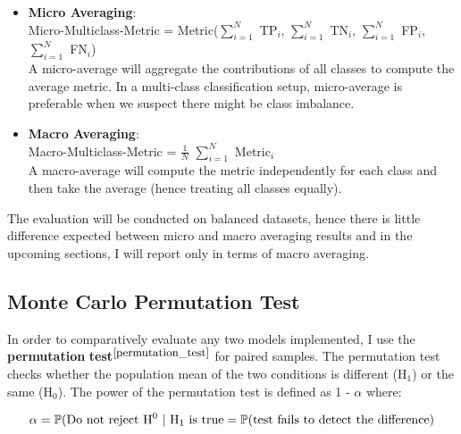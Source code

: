 \begin{itemize}
  \item \textbf{Micro Averaging}: \\
        Micro-Multiclass-Metric = Metric($\sum_{i=1}^{N}$ TP$_i$, $\sum_{i=1}^{N}$ TN$_i$, $\sum_{i=1}^{N}$ FP$_i$, $\sum_{i=1}^{N}$ FN$_i$) \\
        A micro-average will aggregate the contributions of all classes to compute the average metric. In a multi-class classification setup, micro-average is preferable when we suspect there might be class imbalance.

  \item \textbf{Macro Averaging}: \\
        Macro-Multiclass-Metric = $\tfrac{1}{N}$ $\sum_{i=1}^{N}$ Metric$_i$ \\
        A macro-average will compute the metric independently for each class and then take the average (hence treating all classes equally).
\end{itemize}

The evaluation will be conducted on balanced datasets, hence there is little difference expected between micro and macro averaging results and in the upcoming sections, I will report only in terms of macro averaging. 


\subsection{Monte Carlo Permutation Test} \label{monte carlo}

In order to comparatively evaluate any two models implemented, I use the \textbf{permutation} \textbf{test}$^{\small \cite{permutation_test}}$ for paired samples. The permutation test checks whether the population mean of the two conditions is different (H$_1$) or the same (H$_0$). The power of the permutation test is defined as 1 - $\alpha$ where:

\begin{equation}
  \centering
  \alpha = \mathbb{P}(\text{Do not reject H$^0$ | H$_1$ is true} = \mathbb{P}(\text{test fails to detect the difference}) \newline
\end{equation}

